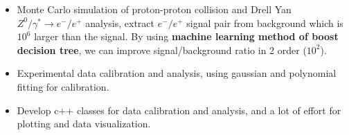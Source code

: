 \documentclass[10pt,a4paper,ragged2e]{mhcv}
\begin{document}

\begin{fullwidth}
\makecvheader
\end{fullwidth}




\iftrue
{}
\begin{itemize}
  \item Monte Carlo simulation of proton-proton collision and Drell Yan $Z^0/\gamma^*\rightarrow e^-/e^+$ analysis, extract $e^-/e^+$ signal pair from background which is $10^6$ larger than the signal. By using \textbf{machine learning method of boost decision tree}, we can improve signal/background ratio in 2 order ($10^2$).
    \item Experimental data calibration and analysis, using gaussian and polynomial fitting for calibration.
    \item Develop c++ classes for data calibration and analysis, and a lot of effort for plotting and data visualization. 
\end{itemize}
\end{document}
